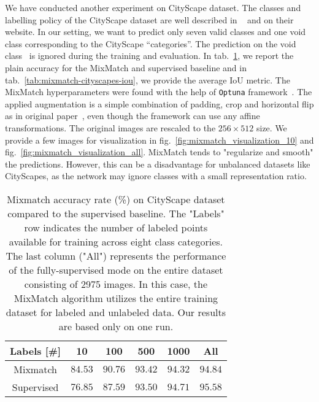 We have conducted another experiment on CityScape dataset. The classes and labelling policy of the CityScape
dataset are well described in ~\cite{cityscapes-2016} and on their website. In our setting, we want to predict only 
seven valid classes and one void class corresponding to the CityScape ``categories''. The prediction on the void class \
is ignored during the training and evaluation. In tab.~\ref{tab:mixmatch-cityscapes}, we report the plain accuracy for 
the MixMatch and supervised baseline and in tab.~\ref{tab:mixmatch-cityscapes-iou}, we provide the average $\mathrm{IoU}$ metric. 
The MixMatch hyperparameters were found with the help of \texttt{Optuna} framework~\cite{optuna-2019}.
The applied augmentation is a simple combination of padding, crop and horizontal flip as in original paper~\cite{mixmatch-2019}, even
though the framework can use any affine transformations. The original images are rescaled to the $256 \times 512$ size.
We provide a few images for visualization in fig.~\ref{fig:mixmatch_visualization_10} and fig.~\ref{fig:mixmatch_visualization_all}. 
MixMatch tends to "regularize and smooth" the predictions. However, this can be a disadvantage for unbalanced datasets 
like CityScapes, as the network may ignore classes with a small representation ratio.

\begin{table}[tbh]
    \begin{tabular}{|c|c|c|c|c|c|}
    \hline
    Labels [\#]  & 10 & 100 & 500 & 1000 & All \\
    \hline
    Mixmatch & $84.53$ & $90.76$ & $93.42$ & $94.32$ & $94.84$ \\
    \hline
    Supervised & $76.85$ & $87.59$ & $93.50$ & $94.71$ & $95.58$ \\
    \hline
    \end{tabular}
    \caption[Mixmatch accuracy on CityScape]{Mixmatch accuracy rate (\%) on CityScape dataset compared to the supervised baseline. The 
    "Labels" row indicates the number of labeled points available for training across eight class categories. The last 
    column ("All") represents the performance of the fully-supervised mode on the entire dataset consisting of 2975 images. 
    In this case, the MixMatch algorithm utilizes the entire training dataset for labeled and unlabeled data.
    Our results are based only on one run.}
    \label{tab:mixmatch-cityscapes}
\end{table}

